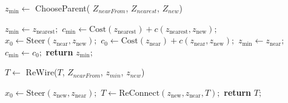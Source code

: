 \documentclass[conference]{IEEEtran}
\begin{document}
\begin{algorithm}
\caption{$z_{\text{min}} \leftarrow$ ChooseParent( $Z_{nearFrom}$,  $Z_{nearest}$,  $Z_{new}$)}
\label{Alg::ChooseParent}
\begin{algorithmic}[1]
\State $z_{\text{min}} \leftarrow z_{\text{nearest}};$
\State $c_{\text{min}} \leftarrow \text{Cost}(z_{\text{nearest}}) + c(z_{\text{nearest}}, z_{\text{new}});$
    \State $x_0 \leftarrow \text{Steer}(z_{\text{near}}, z_{\text{new}});$
        \State $c_0 \leftarrow \text{Cost}(z_{\text{near}}) + c(z_{\text{near}}, z_{\text{new}});$
            \State $z_{\text{min}} \leftarrow z_{\text{near}};$
            \State $c_{\text{min}} \leftarrow c_0;$
        \EndIf
    \EndIf
\EndFor
\State \textbf{return} $z_{\text{min}};$
\end{algorithmic}
\end{algorithm}

\begin{algorithm}
\caption{$T \leftarrow$ ReWire($T$, $Z_{nearFrom}$, $z_{min}$, $z_{new}$)}
\label{Alg::ReWire}
\begin{algorithmic}[1]
    \State $x_0 \leftarrow \text{Steer}(z_{\text{new}}, z_{\text{near}});$
        \State $T \leftarrow \text{ReConnect}(z_{\text{new}}, z_{\text{near}}, T);$
    \EndIf
\EndFor
\State \textbf{return} $T;$
\end{algorithmic}
\end{algorithm}

\end{document}
